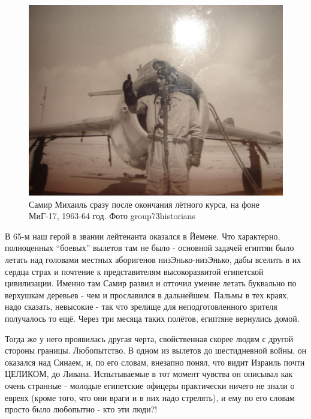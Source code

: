 \begin{figure}[h!tb] 
	\centering\includegraphics[scale=0.35]{History_Fenix/uRqdQTV9U2I.jpg}
	\caption{Самир Михаиль сразу после окончания лётного курса, на фоне МиГ-17, 1963-64 год. Фото group73historians}%
\end{figure}

В 65-м наш герой в звании лейтенанта оказался в Йемене. Что характерно, полноценных “боевых” вылетов там не было - основной задачей египтян было летать над головами местных аборигенов низЭнько-низЭнько, дабы вселить в их сердца страх и почтение к представителям высокоразвитой египетской цивилизации. Именно там Самир развил и отточил умение летать буквально по верхушкам деревьев - чем и прославился в дальнейшем. Пальмы в тех краях, надо сказать, невысокие - так что зрелище для неподготовленного зрителя получалось то ещё. Через три месяца таких полётов, египтяне вернулись домой.

Тогда же у него проявилась другая черта, свойственная скорее людям с другой стороны границы. Любопытство. В одном из вылетов до шестидневной войны, он оказался над Синаем, и, по его словам, внезапно понял, что видит Израиль почти ЦЕЛИКОМ, до Ливана. Испытываемые в тот момент чувства он описывал как очень странные - молодые египетские офицеры практически ничего не знали о евреях (кроме того, что они враги и в них надо стрелять), и ему по его словам просто было любопытно - кто эти люди?!

